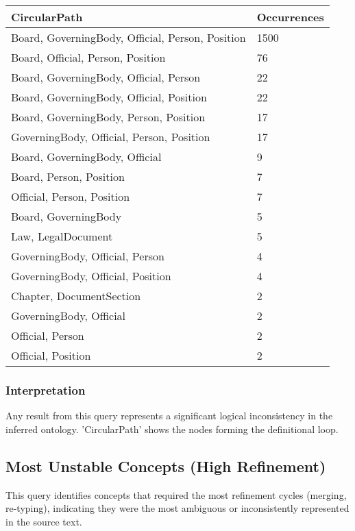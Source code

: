 \begin{longtable}{p{} p{}}
\toprule
\textbf{CircularPath} & \textbf{Occurrences} \\
\midrule
\endfirsthead
\endhead
Board, GoverningBody, Official, Person, Position & 1500 \\
Board, Official, Person, Position & 76 \\
Board, GoverningBody, Official, Person & 22 \\
Board, GoverningBody, Official, Position & 22 \\
Board, GoverningBody, Person, Position & 17 \\
GoverningBody, Official, Person, Position & 17 \\
Board, GoverningBody, Official & 9 \\
Board, Person, Position & 7 \\
Official, Person, Position & 7 \\
Board, GoverningBody & 5 \\
Law, LegalDocument & 5 \\
GoverningBody, Official, Person & 4 \\
GoverningBody, Official, Position & 4 \\
Chapter, DocumentSection & 2 \\
GoverningBody, Official & 2 \\
Official, Person & 2 \\
Official, Position & 2 \\
\bottomrule
\end{longtable}
\subsubsection*{Interpretation}
Any result from this query represents a significant logical inconsistency in the inferred ontology. 'CircularPath' shows the nodes forming the definitional loop.
\clearpage
\subsection*{Most Unstable Concepts (High Refinement)}
This query identifies concepts that required the most refinement cycles (merging, re-typing), indicating they were the most ambiguous or inconsistently represented in the source text.

